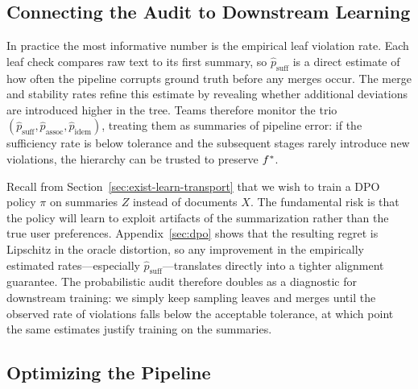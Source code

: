 \subsection{Connecting the Audit to Downstream Learning}

In practice the most informative number is the empirical leaf violation rate. Each leaf check compares raw text to its first summary, so $\hat{p}_{\text{suff}}$ is a direct estimate of how often the pipeline corrupts ground truth before any merges occur. The merge and stability rates refine this estimate by revealing whether additional deviations are introduced higher in the tree. Teams therefore monitor the trio $(\hat{p}_{\text{suff}},\hat{p}_{\text{assoc}},\hat{p}_{\text{idem}})$, treating them as summaries of pipeline error: if the sufficiency rate is below tolerance and the subsequent stages rarely introduce new violations, the hierarchy can be trusted to preserve $f^{\ast}$.

Recall from Section~\ref{sec:exist-learn-transport} that we wish to train a DPO policy $\pi$ on summaries $Z$ instead of documents $X$. The fundamental risk is that the policy will learn to exploit artifacts of the summarization rather than the true user preferences. Appendix~\ref{sec:dpo} shows that the resulting regret is Lipschitz in the oracle distortion, so any improvement in the empirically estimated rates---especially $\hat{p}_{\text{suff}}$---translates directly into a tighter alignment guarantee. The probabilistic audit therefore doubles as a diagnostic for downstream training: we simply keep sampling leaves and merges until the observed rate of violations falls below the acceptable tolerance, at which point the same estimates justify training on the summaries.

\subsection{Optimizing the Pipeline}

